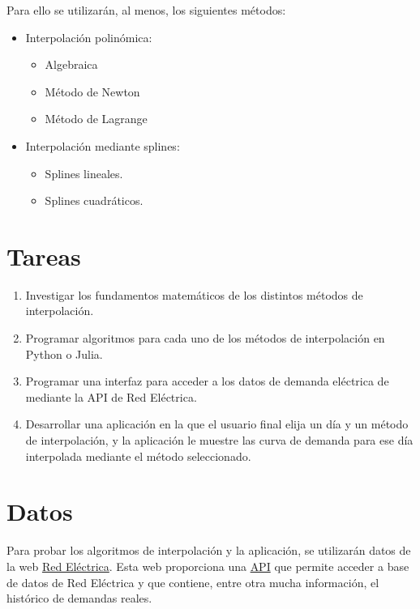 \documentclass[
  a4paper,
]{scrreport}
\providecommand{\tightlist}{%
  \setlength{\itemsep}{0pt}\setlength{\parskip}{0pt}}\usepackage{longtable,booktabs,array}
\begin{document}
Para ello se utilizarán, al menos, los siguientes métodos:

\begin{itemize}
\tightlist
\item
  Interpolación polinómica:

  \begin{itemize}
  \tightlist
  \item
    Algebraica
  \item
    Método de Newton
  \item
    Método de Lagrange
  \end{itemize}
\item
  Interpolación mediante splines:

  \begin{itemize}
  \tightlist
  \item
    Splines lineales.
  \item
    Splines cuadráticos.
  \end{itemize}
\end{itemize}

\hypertarget{tareas}{%
\section{Tareas}\label{tareas}}

\begin{enumerate}
\def\labelenumi{\arabic{enumi}.}
\tightlist
\item
  Investigar los fundamentos matemáticos de los distintos métodos de
  interpolación.
\item
  Programar algoritmos para cada uno de los métodos de interpolación en
  Python o Julia.
\item
  Programar una interfaz para acceder a los datos de demanda eléctrica
  de mediante la API de Red Eléctrica.
\item
  Desarrollar una aplicación en la que el usuario final elija un día y
  un método de interpolación, y la aplicación le muestre las curva de
  demanda para ese día interpolada mediante el método seleccionado.
\end{enumerate}

\hypertarget{datos}{%
\section{Datos}\label{datos}}

Para probar los algoritmos de interpolación y la aplicación, se
utilizarán datos de la web \href{https://www.ree.es/}{Red Eléctrica}.
Esta web proporciona una \href{https://www.ree.es/es/apidatos}{API} que
permite acceder a base de datos de Red Eléctrica y que contiene, entre
otra mucha información, el histórico de demandas reales.
\end{document}

